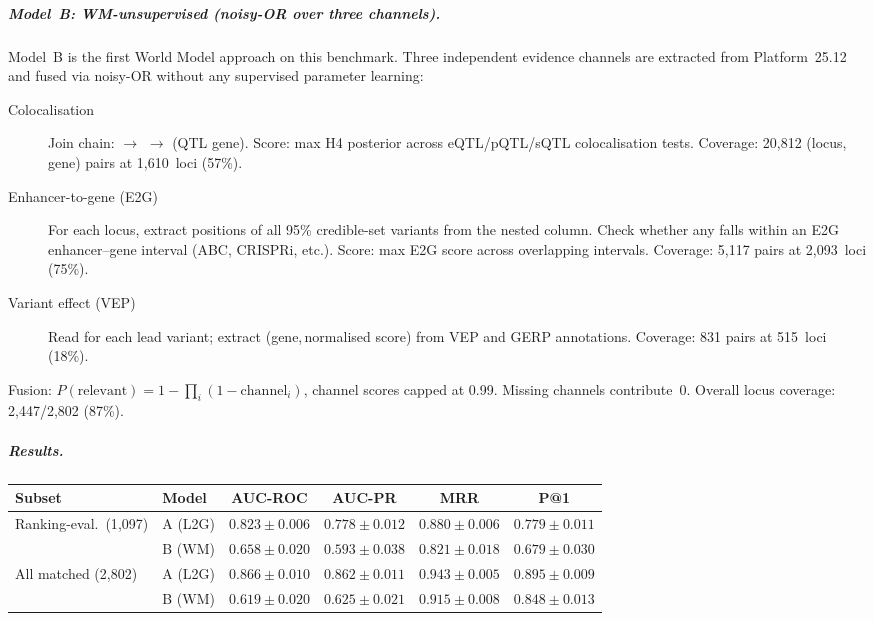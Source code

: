 \documentclass[11pt,openany]{report}
\begin{document}
\subparagraph{Model~B: WM-unsupervised (noisy-OR over three channels).}
Model~B is the first World Model approach on this benchmark.
Three independent evidence channels are extracted from Platform~25.12
and fused via noisy-OR without any supervised parameter learning:
\begin{description}
\item[Colocalisation]
  Join chain: 
  $\to$ 
  $\to$  (QTL gene).
  Score: max H4 posterior across eQTL/pQTL/sQTL colocalisation
  tests.  Coverage: 20,812 (locus,\,gene) pairs at 1,610~loci (57\%).
\item[Enhancer-to-gene (E2G)]
  For each locus, extract positions of all 95\% credible-set variants
  from the nested  column.  Check whether any falls
  within an E2G enhancer--gene interval (ABC, CRISPRi, etc.).
  Score: max E2G score across overlapping intervals.
  Coverage: 5,117 pairs at 2,093~loci (75\%).
\item[Variant effect (VEP)]
  Read  for each lead variant; extract
  (gene,\,normalised score) from VEP and GERP annotations.
  Coverage: 831 pairs at 515~loci (18\%).
\end{description}
\noindent
Fusion: $P(\text{relevant}) = 1 - \prod_i(1 - \text{channel}_i)$,
channel scores capped at 0.99.  Missing channels contribute~0.
Overall locus coverage: 2,447/2,802 (87\%).

\subparagraph{Results.}

\begin{center}
\small
\begin{tabular}{@{}llcccc@{}}
\toprule
\textbf{Subset} & \textbf{Model}
  & \textbf{AUC-ROC} & \textbf{AUC-PR} & \textbf{MRR} & \textbf{P@1} \\
\midrule
Ranking-eval.\ (1{,}097) & A (L2G)  & $0.823 \pm 0.006$ & $0.778 \pm 0.012$
  & $0.880 \pm 0.006$ & $0.779 \pm 0.011$ \\
                         & B (WM)   & $0.658 \pm 0.020$ & $0.593 \pm 0.038$
  & $0.821 \pm 0.018$ & $0.679 \pm 0.030$ \\
\midrule
All matched (2{,}802)    & A (L2G)  & $0.866 \pm 0.010$ & $0.862 \pm 0.011$
  & $0.943 \pm 0.005$ & $0.895 \pm 0.009$ \\
                         & B (WM)   & $0.619 \pm 0.020$ & $0.625 \pm 0.021$
  & $0.915 \pm 0.008$ & $0.848 \pm 0.013$ \\
\bottomrule
\end{tabular}
\end{center}
\end{document}
